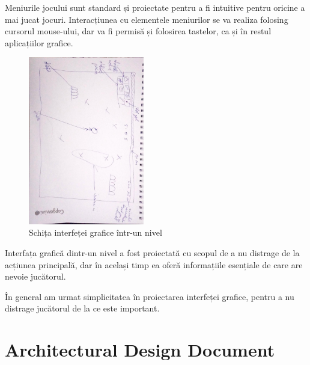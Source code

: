 \documentclass{article}
\begin{document}
    Meniurile jocului sunt standard și proiectate pentru a fi intuitive pentru oricine a mai jucat
    jocuri. Interacțiunea cu elementele meniurilor se va realiza folosing cursorul mouse-ului, dar
    va fi permisă și folosirea tastelor, ca și în restul aplicațiilor grafice.

    \begin{figure}[H]
        \includegraphics[width=0.45\textwidth, angle=90]{designing-level-ui}
        \centering
        \caption{Schița interfeței grafice într-un nivel}
    \end{figure}

    Interfața grafică dintr-un nivel a fost proiectată cu scopul de a nu distrage de
    la acțiunea principală, dar în același timp ea oferă informațiile esențiale de care are
    nevoie jucătorul.

    În general am urmat simplicitatea în proiectarea interfeței grafice, pentru a nu distrage
    jucătorul de la ce este important.

    \FloatBarrier

    \section{Architectural Design Document}
\end{document}
